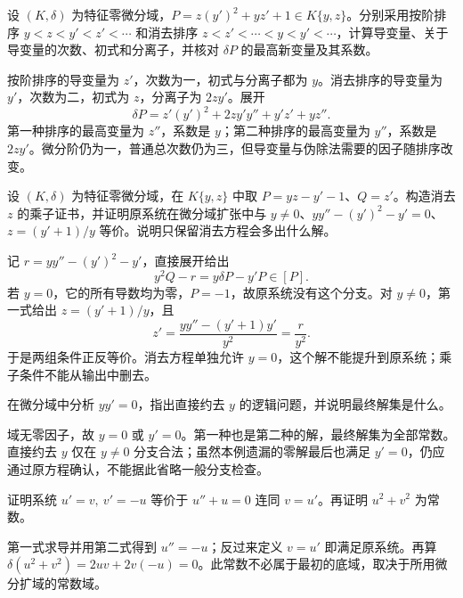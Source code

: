 \begin{exercise}\label{b3:ex:E-initial-separant}
	设 \((K,\delta)\) 为特征零微分域，\(P=z(y')^2+yz'+1\in K\{y,z\}\)。分别采用按阶排序 \(y<z<y'<z'<\cdots\) 和消去排序 \(z<z'<\cdots<y<y'<\cdots\)，计算导变量、关于导变量的次数、初式和分离子，并核对 \(\delta P\) 的最高新变量及其系数。
\end{exercise}
\begin{solution}
	按阶排序的导变量为 \(z'\)，次数为一，初式与分离子都为 \(y\)。消去排序的导变量为 \(y'\)，次数为二，初式为 \(z\)，分离子为 \(2zy'\)。展开
	\[
		\delta P=z'(y')^2+2zy'y''+y'z'+yz''.
	\]
	第一种排序的最高变量为 \(z''\)，系数是 \(y\)；第二种排序的最高变量为 \(y''\)，系数是 \(2zy'\)。微分阶仍为一，普通总次数仍为三，但导变量与伪除法需要的因子随排序改变。
\end{solution}

\begin{exercise}\label{b3:ex:E-branch-certificate}
	设 \((K,\delta)\) 为特征零微分域，在 \(K\{y,z\}\) 中取 \(P=yz-y'-1\)、\(Q=z'\)。构造消去 \(z\) 的乘子证书，并证明原系统在微分域扩张中与 \(y\ne0\)、\(yy''-(y')^2-y'=0\)、\(z=(y'+1)/y\) 等价。说明只保留消去方程会多出什么解。
\end{exercise}
\begin{solution}
	记 \(r=yy''-(y')^2-y'\)，直接展开给出
	\[
		y^2Q-r=y\delta P-y'P\in[P].
	\]
	若 \(y=0\)，它的所有导数均为零，\(P=-1\)，故原系统没有这个分支。对 \(y\ne0\)，第一式给出 \(z=(y'+1)/y\)，且
	\[
		z'=\dfrac{yy''-(y'+1)y'}{y^2}=\dfrac r{y^2}.
	\]
	于是两组条件正反等价。消去方程单独允许 \(y=0\)，这个解不能提升到原系统；乘子条件不能从输出中删去。
\end{solution}

\begin{exercise}\label{b3:ex:E-division-loses-solution}
	在微分域中分析 \(yy'=0\)，指出直接约去 \(y\) 的逻辑问题，并说明最终解集是什么。
\end{exercise}
\begin{solution}
	域无零因子，故 \(y=0\) 或 \(y'=0\)。第一种也是第二种的解，最终解集为全部常数。直接约去 \(y\) 仅在 \(y\ne0\) 分支合法；虽然本例遗漏的零解最后也满足 \(y'=0\)，仍应通过原方程确认，不能据此省略一般分支检查。
\end{solution}

\begin{exercise}\label{b3:ex:E-linear-elimination}
	证明系统 \(u'=v,\ v'=-u\) 等价于 \(u''+u=0\) 连同 \(v=u'\)。再证明 \(u^2+v^2\) 为常数。
\end{exercise}
\begin{solution}
	第一式求导并用第二式得到 \(u''=-u\)；反过来定义 \(v=u'\) 即满足原系统。再算 \(\delta(u^2+v^2)=2uv+2v(-u)=0\)。此常数不必属于最初的底域，取决于所用微分扩域的常数域。
\end{solution}

